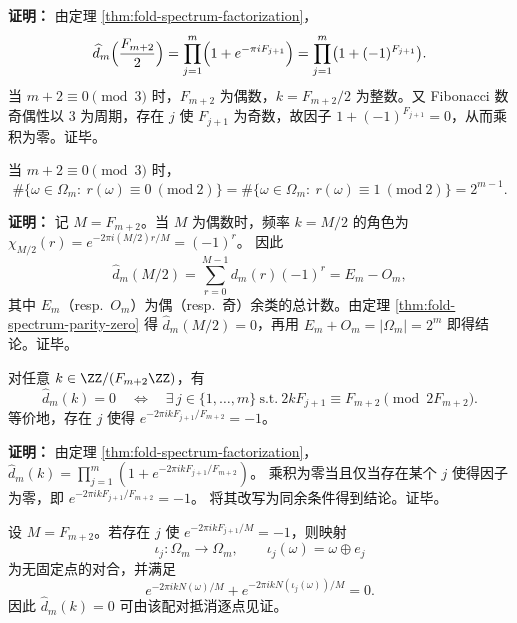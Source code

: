 \textbf{证明：}
由定理 \ref{thm:fold-spectrum-factorization}，
\[
\widehat d_m\Bigl(\frac{F_{m+2}}{2}\Bigr)=\prod_{j=1}^m\Bigl(1+e^{-\pi i F_{j+1}}\Bigr)
=\prod_{j=1}^m\bigl(1+(-1)^{F_{j+1}}\bigr).
\]
当 $m+2\equiv 0\pmod 3$ 时，$F_{m+2}$ 为偶数，$k=F_{m+2}/2$ 为整数。又 Fibonacci 数奇偶性以 3 为周期，存在 $j$ 使 $F_{j+1}$ 为奇数，故因子 $1+(-1)^{F_{j+1}}=0$，从而乘积为零。证毕。

\begin{corollary}[严格奇偶平衡律]\label{cor:fold-even-odd-balance}
当 $m+2\equiv 0\pmod 3$ 时，
\[
\#\{\omega\in\Omega_m:\ r(\omega)\equiv 0\ (\mathrm{mod}\ 2)\}
=
\#\{\omega\in\Omega_m:\ r(\omega)\equiv 1\ (\mathrm{mod}\ 2)\}
=2^{m-1}.
\]
\end{corollary}

\textbf{证明：}
记 $M=F_{m+2}$。当 $M$ 为偶数时，频率 $k=M/2$ 的角色为
\(
\chi_{M/2}(r)=e^{-2\pi i (M/2)r/M}=(-1)^r
\)。
因此
\[
\widehat d_m(M/2)=\sum_{r=0}^{M-1} d_m(r)(-1)^r
=E_m-O_m,
\]
其中 $E_m$（resp.\ $O_m$）为偶（resp.\ 奇）余类的总计数。由定理 \ref{thm:fold-spectrum-parity-zero} 得 $\widehat d_m(M/2)=0$，再用 $E_m+O_m=|\Omega_m|=2^m$ 即得结论。证毕。

\begin{theorem}[谱零点的同余判别]
\label{thm:fold-spectrum-zero-criterion}
对任意 $k\in\ZZ/(F_{m+2}\ZZ)$，有
\[
\widehat d_m(k)=0\quad\Longleftrightarrow\quad\exists\,j\in\{1,\dots,m\}\ \text{s.t.}\ 2kF_{j+1}\equiv F_{m+2}\pmod{2F_{m+2}}.
\]
等价地，存在 $j$ 使得
\(
e^{-2\pi i k F_{j+1}/F_{m+2}}=-1
\)。
\end{theorem}

\textbf{证明：}
由定理 \ref{thm:fold-spectrum-factorization}，
\(
\widehat d_m(k)=\prod_{j=1}^m(1+e^{-2\pi i k F_{j+1}/F_{m+2}})
\)。
乘积为零当且仅当存在某个 $j$ 使得因子为零，即
\(
e^{-2\pi i k F_{j+1}/F_{m+2}}=-1
\)。
将其改写为同余条件得到结论。证毕。

\begin{corollary}\label{cor:fold-spectrum-zero-involution}
设 $M=F_{m+2}$。若存在 $j$ 使 $e^{-2\pi i k F_{j+1}/M}=-1$，则映射
\[
\iota_j:\Omega_m\to\Omega_m,\qquad \iota_j(\omega)=\omega\oplus e_j
\]
为无固定点的对合，并满足
\[
e^{-2\pi i k N(\omega)/M}+e^{-2\pi i k N(\iota_j(\omega))/M}=0.
\]
因此 $\widehat d_m(k)=0$ 可由该配对抵消逐点见证。
\end{corollary}

